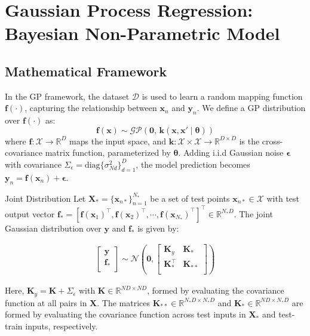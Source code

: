 \section{Gaussian Process Regression: Bayesian Non-Parametric Model}
\subsection{Mathematical Framework}
\begin{frame}
	In the GP framework, the dataset $\mathcal{D}$ is used to learn a random mapping function $\bm{f}(\cdot)$, capturing the relationship between $\bm{x}_n$ and $\bm{y}_n$. We define a GP distribution over $\bm{f}(\cdot)$ as:
	\begin{equation}\label{mogp_notation}
	\bm{f}(\bm{x}) \sim  \mathcal{GP}\left(\bm{0},\, \bm{k}(\bm{x}, \bm{x}' \mid \bm{\theta})\right)
	\end{equation}
	where $\bm{f}: \mathcal{X} \rightarrow \mathbb{R}^D$ maps the input space, and $\bm{k}: \mathcal{X} \times \mathcal{X} \rightarrow \mathbb{R}^{D \times D}$ is the cross-covariance matrix function, parameterized by $\bm{\theta}$. Adding i.i.d Gaussian noise $\bm{\epsilon}$ with covariance $\Sigma_\epsilon = \text{diag}\{\sigma^2_{Nd}\}_{d=1}^D$, the model prediction becomes $\bm{y}_n = \bm{f}(\bm{x}_n) + \bm{\epsilon}$.
\end{frame}

\begin{frame}{Joint Distribution}
	Let $\mathbf{X}_* = \{\bm{x}_{n*}\}_{n=1}^{N_*}$ be a set of test points $\bm{x}_{n*} \in \mathcal{X}$ with test output vector $\mathbf{f}_* = [\bm{f}(\bm{x}_1)^\top, \bm{f}(\bm{x}_2)^\top, \cdots, \bm{f}(\bm{x}_{N_*})^\top]^\top \in \mathbb{R}^{N_* D}$. The joint Gaussian distribution over $\mathbf{y}$ and $\mathbf{f}_*$ is given by:
	
	\begin{equation}\label{sogp_prior_matrix}
	\begin{array}{rcl}
	\left[ \begin{array}{c}
	\mathbf{y}\\
	\mathbf{f_*}\\
	\end{array}
	\right]
	\sim
	\mathcal{N} \left(
	\bm{0},
	\left[ \begin{array}{cc}
	\mathbf{K}_y & \mathbf{K}_*\\
	\mathbf{K}_*^\top & \mathbf{K}_{**}\\
	\end{array}
	\right] \right)
	\end{array}
	\end{equation}
	
	Here, $\mathbf{K}_y=\mathbf{K} + \Sigma_\epsilon$ with $\mathbf{K} \in \mathbb{R}^{ND \times ND}$, formed by evaluating the covariance function at all pairs in $\mathbf{X}$. The matrices $\mathbf{K}_{**} \in \mathbb{R}^{N_*D \times N_*D}$ and $\mathbf{K}_{*} \in \mathbb{R}^{ND \times N_*D}$ are formed by evaluating the covariance function across test inputs in $\mathbf{X}_*$ and test-train inputs, respectively.
\end{frame}

